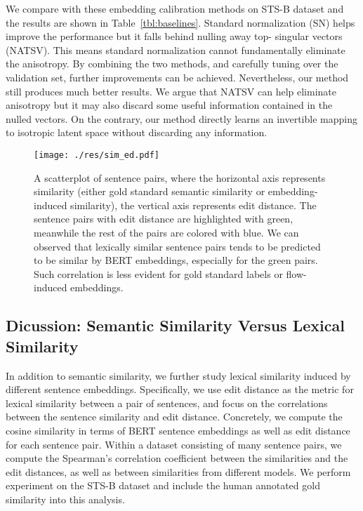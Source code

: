 \documentclass[11pt,a4paper]{article}
\begin{document}
We compare with these embedding calibration methods on STS-B dataset and the results are shown in Table~\ref{tbl:baselines}.
Standard normalization (SN) helps improve the performance but it falls behind nulling away top- singular vectors (NATSV). This means standard normalization cannot fundamentally eliminate the anisotropy. By combining the two methods, and carefully tuning  over the validation set, further improvements can be achieved. Nevertheless, our method still produces much better results. We argue that NATSV can help eliminate anisotropy but it may also discard some useful information contained in the nulled vectors. On the contrary, our method directly learns an invertible mapping to isotropic latent space without discarding any information. 




\begin{figure*}[!t]
	\centering
	\texttt{[image: ./res/sim\_ed.pdf]}
	\caption{\label{fig:sim_ed} A scatterplot of sentence pairs, where the horizontal axis represents similarity (either gold standard semantic similarity or embedding-induced similarity), the vertical axis represents edit distance. The sentence pairs with edit distance  are highlighted with {\color{green} green}, meanwhile the rest of the pairs are colored with {\color{blue} blue}. We can observed that lexically similar sentence pairs tends to be predicted to be similar by BERT embeddings, especially for the green pairs. Such correlation is less evident for gold standard labels or flow-induced embeddings. }
	\vspace{-10pt}
\end{figure*}



\subsection{Dicussion: Semantic Similarity Versus Lexical Similarity }
\label{sec:lexical:similarity}



In addition to semantic similarity, we further study lexical similarity induced by different sentence embeddings. Specifically, we use edit distance as the metric for lexical similarity between a pair of sentences, and focus on the correlations between the sentence similarity and edit distance. Concretely, we compute the cosine similarity in terms of BERT sentence embeddings as well as edit distance for each sentence pair. Within a dataset consisting of many sentence pairs, we compute the Spearman's correlation coefficient  between the similarities and the edit distances, as well as between similarities from different models. We perform experiment on the STS-B dataset and include the human annotated gold similarity into this analysis.
\end{document}
